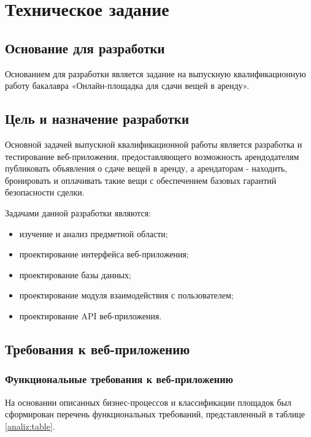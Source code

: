 \section{Техническое задание}
\subsection{Основание для разработки}

Основанием для разработки является задание на выпускную квалификационную работу бакалавра «Онлайн-площадка для сдачи вещей в аренду».

\subsection{Цель и назначение разработки}

Основной задачей выпускной квалификационной работы является разработка и тестирование веб-приложения, предоставляющего возможность арендодателям публиковать объявления о сдаче вещей в аренду, а арендаторам - находить, бронировать и оплачивать такие вещи с обеспечением базовых гарантий безопасности сделки.

Задачами данной разработки являются:
\begin{itemize}
\item изучение и анализ предметной области;
\item проектирование интерфейса веб-приложения;
\item проектирование базы данных;
\item проектирование модуля взаимодействия с пользователем;
\item проектирование API веб-приложения.
\end{itemize}
\subsection{Требования к веб-приложению}

\subsubsection{Функциональные требования к веб-приложению}

На основании описанных бизнес-процессов и классификации площадок был сформирован перечень функциональных требований, представленный в таблице \ref{analiz:table}.

